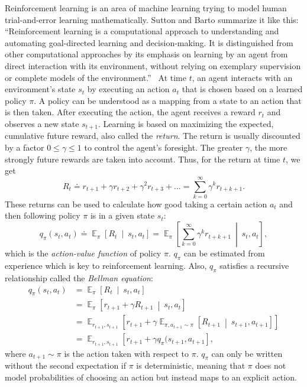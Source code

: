 \documentclass[a4paper,titlepage]{article}
\DeclareMathOperator{\Expectation}{\mathbb{E}}
\newcommand{\Exp}[3]{\Expectation_{#1} \left[ #2 \ \middle| \ #3 \right]}
\newcommand{\Ex}[2]{\Expectation_{#1} \left[ #2 \right]}
\begin{document}
Reinforcement learning is an area of machine learning trying to model human trial-and-error learning mathematically. Sutton and Barto summarize it like this: ``Reinforcement learning is a computational approach to understanding and automating goal-directed learning and decision-making. It is distinguished from other computational approaches by its emphasis on learning by an agent from direct interaction with its environment, without relying on exemplary supervision or complete models of the environment.''~\cite[p.~15]{book} At time $t$, an agent interacts with an environment's state $s_t$ by executing an action $a_t$ that is chosen based on a learned policy $\pi$. A policy can be understood as a mapping from a state to an action that is then taken. After executing the action, the agent receives a reward $r_t$ and observes a new state $s_{t+1}$. Learning is based on maximizing the expected, cumulative future reward, also called the \emph{return}. The return is usually discounted by a factor $0 \leq \gamma \leq 1$ to control the agent's foresight. The greater $\gamma$, the more strongly future rewards are taken into account. Thus, for the return at time $t$, we get
\begin{equation*}
  R_t \doteq r_{t+1} + \gamma r_{t+2} + \gamma^2 r_{t+3} + ... = \sum_{k = 0}^{\infty} \gamma^k r_{t+k+1}.
\end{equation*}
These returns can be used to calculate how good taking a certain action $a_t$ and then following policy $\pi$ is in a given state $s_t$:
\begin{equation*}
  q_\pi(s_t, a_t) \doteq \Exp{\pi}{R_t}{s_t, a_t} = \Exp{\pi}{\sum_{k = 0}^{\infty} \gamma^k r_{t+k+1}}{s_t, a_t},
\end{equation*}
which is the \emph{action-value function} of policy $\pi$.
$q_\pi$ can be estimated from experience which is key to reinforcement learning.
Also, $q_\pi$ satisfies a recursive relationship called the \emph{Bellman equation}:
\begin{align*}
  q_\pi(s_t, a_t) &= \Exp{\pi}{R_t}{s_t, a_t} \\
  &= \Exp{\pi}{r_{t+1} + \gamma R_{t + 1}}{s_t, a_t} \\
  &= \Ex{r_{t+1}, s_{t+1}}{r_{t+1} + \gamma \Exp{\pi, a_{t+1} \sim \pi}{R_{t+1}}{s_{t+1}, a_{t+1}}} \\
  &= \Ex{r_{t+1}, s_{t+1}}{r_{t+1} + \gamma q_\pi(s_{t+1}, a_{t+1}},
\end{align*}
where $a_{t+1} \sim \pi$ is the action taken with respect to $\pi$.
$q_\pi$ can only be written without the second expectation if $\pi$ is deterministic, meaning that $\pi$ does not model probabilities of choosing an action but instead maps to an explicit action.
\end{document}
